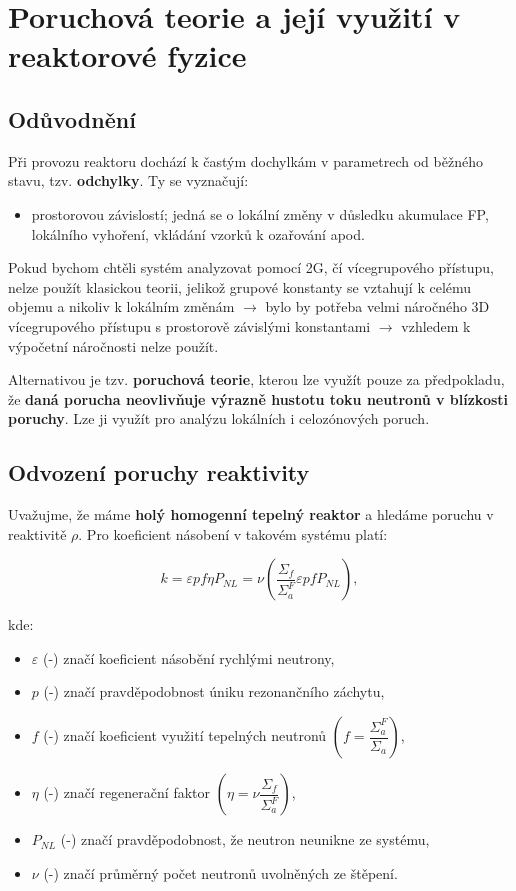 \section[Poruchová teorie]{Poruchová teorie a její využití v reaktorové fyzice}

\subsection{Odůvodnění}

Při provozu reaktoru dochází k častým dochylkám v parametrech od běžného stavu, tzv. \textbf{odchylky}. Ty se vyznačují:

\begin{itemize}
  \item prostorovou závislostí; jedná se o lokální změny v důsledku akumulace FP, lokálního vyhoření, vkládání vzorků k ozařování apod.
\end{itemize}

Pokud bychom chtěli systém analyzovat pomocí 2G, čí vícegrupového přístupu, nelze použít klasickou teorii, jelikož grupové konstanty se vztahují k celému objemu a nikoliv k lokálním změnám $\rightarrow$ bylo by potřeba velmi náročného 3D vícegrupového přístupu s prostorově závislými konstantami $\rightarrow$ vzhledem k výpočetní náročnosti nelze použít.

Alternativou je tzv. \textbf{poruchová teorie}, kterou lze využít pouze za předpokladu, že \textbf{daná porucha neovlivňuje výrazně hustotu toku neutronů v blízkosti poruchy}. Lze ji využít pro analýzu lokálních i celozónových poruch.

\subsection{Odvození poruchy reaktivity}

Uvažujme, že máme \textbf{holý homogenní tepelný reaktor} a hledáme poruchu v reaktivitě $\rho$. Pro koeficient násobení v takovém systému platí:

$$ k = \varepsilon p f \eta P_{NL} = \nu \left ( \dfrac{\Sigma_f}{\Sigma_a^F} \varepsilon p f P_{NL} \right ), $$

kde:

\begin{itemize}
  \item $\varepsilon$ (-) značí koeficient násobění rychlými neutrony,
  \item $p$ (-) značí pravděpodobnost úniku rezonančního záchytu,
  \item $f$ (-) značí koeficient využití tepelných neutronů $\left ( f = \dfrac{\Sigma_a^F}{\Sigma_a} \right )$,
  \item $\eta$ (-) značí regenerační faktor $\left ( \eta = \nu \dfrac{\Sigma_f}{\Sigma_a^F} \right )$,
  \item $P_{NL}$ (-) značí pravděpodobnost, že neutron neunikne ze systému,
  \item $\nu$ (-) značí průměrný počet neutronů uvolněných ze štěpení.
\end{itemize}

